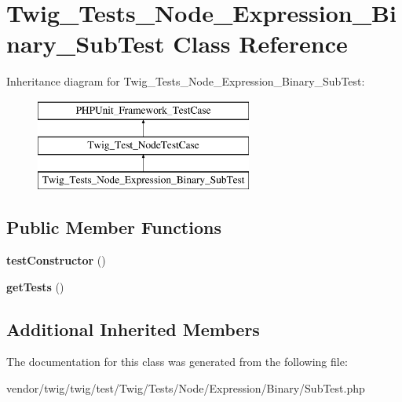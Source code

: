 \hypertarget{classTwig__Tests__Node__Expression__Binary__SubTest}{}\section{Twig\+\_\+\+Tests\+\_\+\+Node\+\_\+\+Expression\+\_\+\+Binary\+\_\+\+Sub\+Test Class Reference}
\label{classTwig__Tests__Node__Expression__Binary__SubTest}
Inheritance diagram for Twig\+\_\+\+Tests\+\_\+\+Node\+\_\+\+Expression\+\_\+\+Binary\+\_\+\+Sub\+Test\+:\begin{figure}[H]
\begin{center}
\leavevmode
\includegraphics[height=3.000000cm]{classTwig__Tests__Node__Expression__Binary__SubTest}
\end{center}
\end{figure}
\subsection*{Public Member Functions}
\begin{DoxyCompactItemize}
\item 
{\bfseries test\+Constructor} ()\hypertarget{classTwig__Tests__Node__Expression__Binary__SubTest_a161372ebc7d6c07d490b87c7d23c46dd}{}\label{classTwig__Tests__Node__Expression__Binary__SubTest_a161372ebc7d6c07d490b87c7d23c46dd}

\item 
{\bfseries get\+Tests} ()\hypertarget{classTwig__Tests__Node__Expression__Binary__SubTest_a1941d9866f36b365ac84f601dc81d140}{}\label{classTwig__Tests__Node__Expression__Binary__SubTest_a1941d9866f36b365ac84f601dc81d140}

\end{DoxyCompactItemize}
\subsection*{Additional Inherited Members}


The documentation for this class was generated from the following file\+:\begin{DoxyCompactItemize}
\item 
vendor/twig/twig/test/\+Twig/\+Tests/\+Node/\+Expression/\+Binary/Sub\+Test.\+php\end{DoxyCompactItemize}

